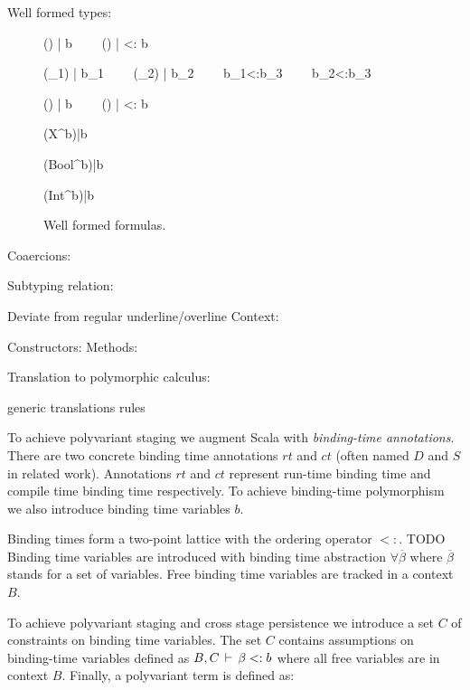 Well formed types:
\begin{figure}[H]
  \infrule
  {\wff(\sigma) | b \ \ \ \ \wff(\overline{\tau}) | \overline{\tau} <: b}
  {}

  \infrule
  {\wff(\tau_1) | b_1 \ \ \ \ \wff(\tau_2) | b_2 \ \ \ \ b_1<:b_3 \ \ \ \ b_2<:b_3}
  {}

  \infrule
  {\wff(\sigma) | b \ \ \ \ \wff(\overline{\tau}) | \overline{\tau} <: b}
  {}

  \infax
  {\wff(X^b)|b}

  \infax
  {\wff(Bool^b)|b}

  \infax
  {\wff(Int^b)|b}

\caption {Well formed formulas.}
\end{figure}

Coaercions:

Subtyping relation:

Deviate from regular underline/overline
Context:

Constructors:
Methods:

Translation to polymorphic calculus:

generic translations rules


To achieve polyvariant staging we augment Scala with \emph{binding-time
annotations}. There are two concrete binding time annotations $rt$ and $ct$
(often named $D$ and $S$ in related work). Annotations $rt$ and $ct$ represent
run-time binding time and compile time binding time respectively. To achieve
binding-time polymorphism we also introduce binding time variables $b$.

Binding times form a two-point lattice with the ordering operator $<:$.
TODO
Binding time variables are introduced with binding time abstraction $\forall \overline{\beta}$ where $\overline{\beta}$
stands for a set of variables. Free binding time variables are tracked in a context $B$.

To achieve polyvariant staging and cross stage persistence we introduce a set $C$ of constraints
on binding time variables. The set $C$ contains assumptions on binding-time variables defined as $B, C \,\vdash\, \beta <: b$ where all free variables are in context $B$. Finally, a polyvariant term is defined as:

